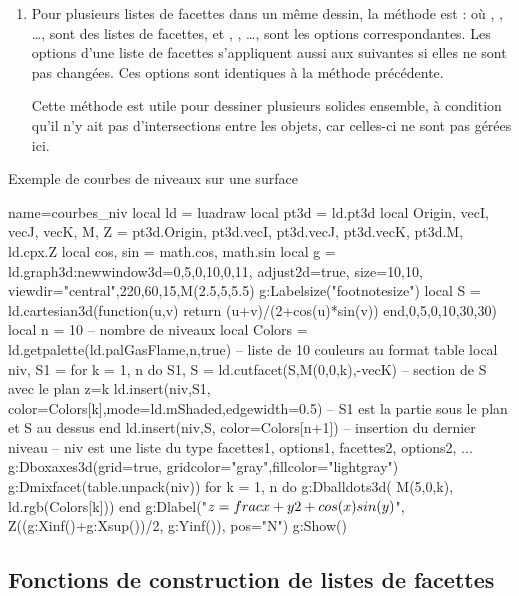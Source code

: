 \begin{enumerate}
    \item Pour plusieurs listes de facettes dans un même dessin, la méthode est :
    où , , \ldots, sont des listes de facettes, et , , \ldots, sont les options correspondantes. Les options d'une liste de facettes s'appliquent aussi aux suivantes si elles ne sont pas changées. Ces options sont identiques à la méthode précédente.
    
    Cette méthode est utile pour dessiner plusieurs solides ensemble, à condition qu'il n'y ait pas d'intersections entre les objets, car celles-ci ne sont pas gérées ici.
\end{enumerate}

\begin{demo}[courbeniv]{Exemple de courbes de niveaux sur une surface}
\begin{luadraw}{name=courbes_niv}
local ld = luadraw
local pt3d = ld.pt3d
local Origin, vecI, vecJ, vecK, M, Z = pt3d.Origin, pt3d.vecI, pt3d.vecJ, pt3d.vecK, pt3d.M, ld.cpx.Z
local cos, sin = math.cos, math.sin
local g = ld.graph3d:new{window3d={0,5,0,10,0,11}, adjust2d=true, size={10,10},
    viewdir={"central",220,60,15,M(2.5,5,5.5)}}
g:Labelsize("footnotesize")
local S = ld.cartesian3d(function(u,v) return (u+v)/(2+cos(u)*sin(v)) end,0,5,0,10,{30,30})
local n = 10 -- nombre de niveaux
local Colors = ld.getpalette(ld.palGasFlame,n,true) -- liste de 10 couleurs au format table
local niv, S1 = {}
for k = 1, n do
    S1, S = ld.cutfacet(S,{M(0,0,k),-vecK}) -- section de S avec le plan z=k
    ld.insert(niv,{S1, {color=Colors[k],mode=ld.mShaded,edgewidth=0.5}}) -- S1 est la partie sous le plan et S au dessus
end
ld.insert(niv,{S, {color=Colors[n+1]}}) -- insertion du dernier niveau
-- niv est une liste du type {facettes1, options1, facettes2, options2, ...}
g:Dboxaxes3d({grid=true, gridcolor="gray",fillcolor="lightgray"})
g:Dmixfacet(table.unpack(niv))
for k = 1, n do
    g:Dballdots3d( M(5,0,k), ld.rgb(Colors[k]))
end
g:Dlabel("$z=\\frac{x+y}{2+\\cos(x)\\sin(y)}$", Z((g:Xinf()+g:Xsup())/2, g:Yinf()), {pos="N"})
g:Show()
\end{luadraw}
\end{demo}

\subsection{Fonctions de construction de listes de facettes}


